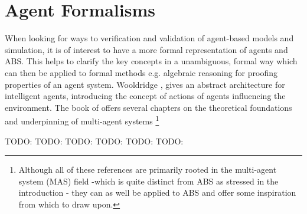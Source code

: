 \section{Agent Formalisms}
When looking for ways to verification and validation of agent-based models and simulation, it is of interest to have a more formal representation of agents and ABS. This helps to clarify the key concepts in a unambiguous, formal way which can then be applied to formal methods e.g. algebraic reasoning for proofing properties of an agent system. Wooldridge \cite{wooldridge_introduction_2009}, \cite{wooldridge_intelligent_1995} gives an abstract architecture for intelligent agents, introducing the concept of actions of agents influencing the environment. The book of \cite{weiss_multiagent_2013} offers several chapters on the theoretical foundations and underpinning of multi-agent systems \footnote{Although all of these references are primarily rooted in the multi-agent system (MAS) field -which is quite distinct from ABS as stressed in the introduction - they can as well be applied to ABS and offer some inspiration from which to draw upon.}

TODO: \cite{klugl_amason:_2013}
TODO: \cite{jennings_agent-based_2000}
TODO: \cite{lerman_design_2000}
TODO: \cite{dinverno_formal_2000}
TODO: \cite{araragi_formal_2000}
TODO: \cite{carchiolo_using_2000}

